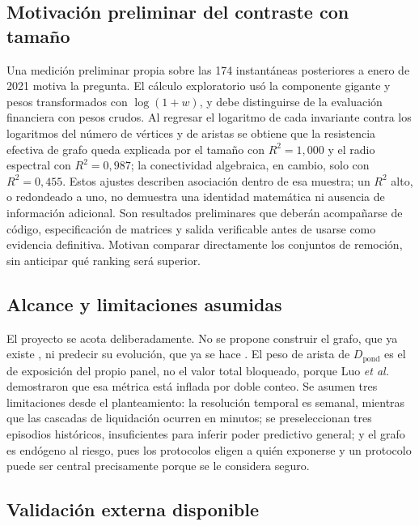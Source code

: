 \documentclass[journal]{IEEEtran}
\begin{document}
\subsection{Motivación preliminar del contraste con tamaño}

Una medición preliminar propia sobre las 174 instantáneas posteriores a enero de
2021 motiva la pregunta. El cálculo exploratorio usó la componente gigante y
pesos transformados con $\log(1+w)$, y debe distinguirse de la evaluación
financiera con pesos crudos. Al regresar el logaritmo de cada invariante contra los
logaritmos del número de vértices y de aristas se obtiene que la resistencia
efectiva de grafo queda explicada por el tamaño con $R^2 = 1{,}000$ y el radio
espectral con $R^2 = 0{,}987$; la conectividad algebraica, en cambio, solo con
$R^2 = 0{,}455$. Estos ajustes describen asociación dentro de esa muestra;
un $R^2$ alto, o redondeado a uno, no demuestra una identidad matemática ni
ausencia de información adicional. Son resultados preliminares que deberán
acompañarse de código, especificación de matrices y salida verificable antes
de usarse como evidencia definitiva. Motivan comparar directamente los conjuntos
de remoción, sin anticipar qué ranking será superior.

\subsection{Alcance y limitaciones asumidas}

El proyecto se acota deliberadamente. No se propone construir el grafo, que ya
existe \cite{wu2025dexposure}, ni predecir su evolución, que ya se hace
\cite{shu2026dexposurefm}. El peso de arista de
$D_{\text{pond}}$ es el de exposición del propio panel, no el valor total
bloqueado, porque Luo \emph{et al.} \cite{luo2024piercing} demostraron que esa
métrica está inflada por doble conteo. Se asumen tres limitaciones desde el
planteamiento: la resolución temporal es semanal, mientras que las cascadas de
liquidación ocurren en minutos; se preseleccionan tres episodios históricos,
insuficientes para inferir poder predictivo general; y el grafo es endógeno al riesgo, pues los protocolos
eligen a quién exponerse y un protocolo puede ser central precisamente porque se
le considera seguro.

\subsection{Validación externa disponible}
\end{document}
